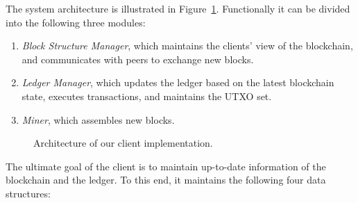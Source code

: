 




The system architecture is illustrated in Figure~\ref{fig:system-architecture}. Functionally it can be divided into the following three modules:

\begin{enumerate}
    \item \textit{Block Structure Manager}, which maintains the clients' view of the blockchain, and communicates with peers to exchange new blocks.
    \item \textit{Ledger Manager}, which updates the ledger based on the latest blockchain state, executes transactions, and maintains the UTXO set.
    \item \textit{Miner}, which assembles new blocks.
\end{enumerate}

\begin{figure}
    \centering
    \resizebox{0.6\textwidth}{!}{}
    \caption{\small Architecture of our \prism client implementation.}
    \label{fig:system-architecture}
\end{figure}

\noindent %
The ultimate goal of the \prism client is to maintain up-to-date information of the blockchain and the ledger. To this end, it maintains the following four data structures:

